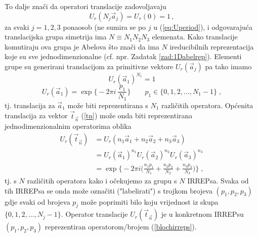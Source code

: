 To dalje znači da operatori translacije zadovoljavaju
\begin{equation}
       U_{r}(N_j \vec{a}_j) = U_{r}(0) = 1 \,,  
       \label{eq:Uperiod}
\end{equation}
za svaki $j=1,2,3$ ponaosob (ne sumira se po $j$ u (\ref{eq:Uperiod}),
i odgovarajuća translacijska grupa simetrija ima $N\equiv N_1 N_2 N_3$
elemenata. Kako translacije komutiraju ova grupa je Abelova što
znači da ima $N$ ireducibilnih reprezentacija koje su
sve jednodimenzionalne (cf. npr. Zadatak \ref{zad:1Dabelrep}).
Elementi grupe su generirani translacijom za primitivne vektore
$U_{r}(\vec{a}_j)$  pa tako imamo
\begin{equation}
U_{r}(\vec{a}_1)^{N_1} = 1 
\end{equation}
\begin{equation}
U_{r}(\vec{a}_1) = \exp\Big\{-2\pi i\: \frac{p_1 }{N_1}\Big\} \qquad 
 p_1 \in \{0,1,2,\ldots ,N_1 -1\} \;,
\end{equation}
tj. translacija za $\vec{a}_1$ može biti reprezentirana s
$N_1$ različitih operatora.  Općenita translacija za vektor 
$\vec{t}_{\vec{n}}$ (\ref{tn}) može onda biti reprezentirana jednodimenzionalnim
operatorima oblika
\begin{align}
 U_{r}(\vec{t}_{\vec{n}}) &=
 U_{r}(n_1 \vec{a}_1 + n_2 \vec{a}_2 + n_3  \vec{a}_3) \\
 &= U_{r}(\vec{a}_1)^{n_1} U_{r}(\vec{a}_2)^{n_2} U_{r}(\vec{a}_3)^{n_3} \\
 &= \exp\Big\{ -2\pi i \Big( \frac{n_1 p_1}{N_1} + \frac{n_2 p_2}{N_2} 
 + \frac{n_3 p_3}{N_3} \Big)\Big\} \;,
\label{blochirreps}
\end{align}
tj. s $N$ različitih operatora kako i očekujemo za grupu s $N$ IRREPsa.
Svaka od tih IRREPsa se onda može označiti ("labelirati") s trojkom brojeva $(p_1, p_2, p_3)$
gdje svaki od brojeva $p_j$ može poprimiti bilo koju vrijednost iz
skupa $\{0, 1, 2, \ldots ,N_j -1\}$.
Operator translacije $U_{r}(\vec{t}_{\vec{n}})$ je u konkretnom IRREPsu 
 $(p_1, p_2, p_3)$ reprezentiran operatorom/brojem (\ref{blochirreps}).

